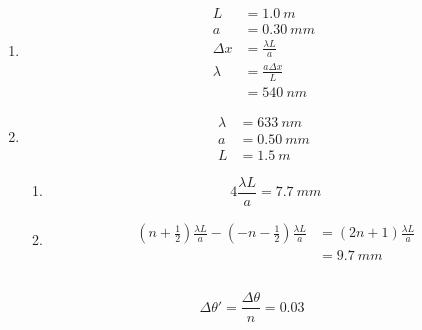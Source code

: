 \documentclass{article}
\begin{document}
\begin{enumerate}
  \item

        \begin{align*}
          L        & = \qty{1.0}{m}         \\
          a        & = \qty{0.30}{mm}       \\
          \Delta x & = \frac{\lambda L}{a}  \\
          \lambda  & = \frac{a \Delta x}{L} \\
                   & = \qty{540}{nm}
        \end{align*}

  \item

        \begin{align*}
          \lambda & = \qty{633}{nm}  \\
          a       & = \qty{0.50}{mm} \\
          L       & = \qty{1.5}{m}
        \end{align*}

        \begin{enumerate}
          \item \[4 \frac{\lambda L}{a} = \qty{7.7}{mm}\]

          \item

                \begin{align*}
                  \left( n + \frac{1}{2} \right) \frac{\lambda L}{a} - \left( -n - \frac{1}{2} \right) \frac{\lambda L}{a} & = (2 n + 1) \frac{\lambda L}{a} \\
                                                                                                                           & = \qty{9.7}{mm}
                \end{align*}
        \end{enumerate}
\end{enumerate}

\subsection{}

\[\Delta \theta' = \frac{\Delta \theta}{n} = 0.03\]

\subsection{}
\end{document}
